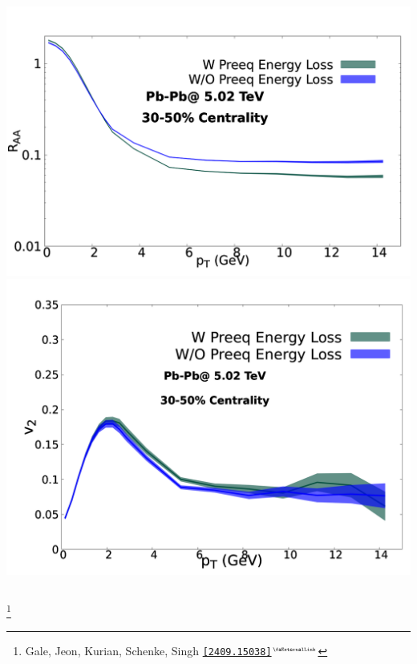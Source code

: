 \documentclass[aspectratio=169,11pt,usenames,dvipsnames]{beamer}
\renewcommand{\thefootnote}{\color{customblue}\faPaperPlaneO}
\newcommand\blfootnote[1]{%
  \begingroup
  \renewcommand\thefootnote{}\footnote{#1}%
  \addtocounter{footnote}{-1}%
  \endgroup
}
\begin{document}
\begin{frame}
\begin{center}
\begin{columns}
                \begin{center}\includegraphics[width=\columnwidth]{images/RAA.png}\\
                    \includegraphics[width=\columnwidth]{images/v2.png}\end{center}
        \end{columns}
    \end{center}

    \vspace{-15pt}
    \blfootnote{\scriptsize Gale, Jeon, Kurian, Schenke, Singh \href{https://arxiv.org/abs/2409.15038}{{\color{blue}\texttt{[2409.15038]$^\text{\tiny\faExternalLink}$}}}}
\end{frame}


\end{document}
